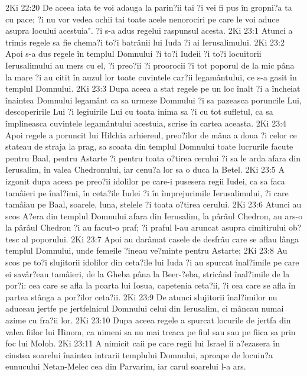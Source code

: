 2Ki 22:20  De aceea iata te voi adauga la parin?ii tai ?i vei fi pus în gropni?a ta cu pace; ?i nu vor vedea ochii tai toate acele nenorociri pe care le voi aduce asupra locului acestuia". ?i s-a adus regelui raspunsul acesta.
2Ki 23:1  Atunci a trimis regele sa fie chema?i to?i batrânii lui Iuda ?i ai Ierusalimului.
2Ki 23:2  Apoi s-a dus regele în templul Domnului ?i to?i Iudeii ?i to?i locuitorii Ierusalimului au mers cu el, ?i preo?ii ?i proorocii ?i tot poporul de la mic pâna la mare ?i au citit în auzul lor toate cuvintele car?ii legamântului, ce s-a gasit în templul Domnului.
2Ki 23:3  Dupa aceea a stat regele pe un loc înalt ?i a încheiat înaintea Domnului legamânt ca sa urmeze Domnului ?i sa pazeasca poruncile Lui, descoperirile Lui ?i legiuirile Lui cu toata inima sa ?i cu tot sufletul, ca sa împlineasca cuvintele legamântului acestuia, scrise în cartea aceasta.
2Ki 23:4  Apoi regele a poruncit lui Hilchia arhiereul, preo?ilor de mâna a doua ?i celor ce stateau de straja la prag, sa scoata din templul Domnului toate lucrurile facute pentru Baal, pentru Astarte ?i pentru toata o?tirea cerului ?i sa le arda afara din Ierusalim, în valea Chedronului, iar cenu?a lor sa o duca la Betel.
2Ki 23:5  A izgonit dupa aceea pe preo?ii idolilor pe care-i pusesera regii Iudei, ca sa faca tamâieri pe înal?imi, în ceta?ile Iudei ?i în împrejurimile Ierusalimului, ?i care tamâiau pe Baal, soarele, luna, stelele ?i toata o?tirea cerului.
2Ki 23:6  Atunci au scos A?era din templul Domnului afara din Ierusalim, la pârâul Chedron, au ars-o la pârâul Chedron ?i au facut-o praf; ?i praful l-au aruncat asupra cimitirului ob?tesc al poporului.
2Ki 23:7  Apoi au darâmat casele de desfrâu care se aflau lânga templul Domnului, unde femeile ?ineau ve?minte pentru Astarte;
2Ki 23:8  Au scos pe to?i slujitorii idolilor din ceta?ile lui Iuda ?i au spurcat înal?imile pe care ei savâr?eau tamâieri, de la Gheba pâna la Beer-?eba, stricând înal?imile de la por?i: cea care se afla la poarta lui Iosua, capetenia ceta?ii, ?i cea care se afla în partea stânga a por?ilor ceta?ii.
2Ki 23:9  De atunci slujitorii înal?imilor nu aduceau jertfe pe jertfelnicul Domnului celui din Ierusalim, ci mâncau numai azime cu fra?ii lor.
2Ki 23:10  Dupa aceea regele a spurcat locurile de jertfa din valea fiilor lui Hinom, ca nimeni sa nu mai treaca pe fiul sau sau pe fiica sa prin foc lui Moloh.
2Ki 23:11  A nimicit caii pe care regii lui Israel îi a?ezasera în cinstea soarelui înaintea intrarii templului Domnului, aproape de locuin?a eunucului Netan-Melec cea din Parvarim, iar carul soarelui l-a ars.
